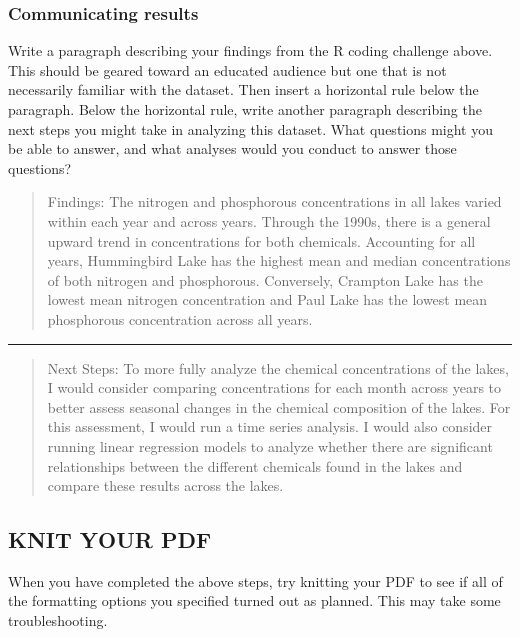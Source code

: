 \documentclass[
]{article}
\begin{document}
\hypertarget{communicating-results}{%
\subsubsection{Communicating results}\label{communicating-results}}

Write a paragraph describing your findings from the R coding challenge
above. This should be geared toward an educated audience but one that is
not necessarily familiar with the dataset. Then insert a horizontal rule
below the paragraph. Below the horizontal rule, write another paragraph
describing the next steps you might take in analyzing this dataset. What
questions might you be able to answer, and what analyses would you
conduct to answer those questions?

\begin{quote}
Findings: The nitrogen and phosphorous concentrations in all lakes
varied within each year and across years. Through the 1990s, there is a
general upward trend in concentrations for both chemicals. Accounting
for all years, Hummingbird Lake has the highest mean and median
concentrations of both nitrogen and phosphorous. Conversely, Crampton
Lake has the lowest mean nitrogen concentration and Paul Lake has the
lowest mean phosphorous concentration across all years.
\end{quote}

\begin{center}\rule{0.5\linewidth}{0.5pt}\end{center}

\begin{quote}
Next Steps: To more fully analyze the chemical concentrations of the
lakes, I would consider comparing concentrations for each month across
years to better assess seasonal changes in the chemical composition of
the lakes. For this assessment, I would run a time series analysis. I
would also consider running linear regression models to analyze whether
there are significant relationships between the different chemicals
found in the lakes and compare these results across the lakes.
\end{quote}

\hypertarget{knit-your-pdf}{%
\subsection{KNIT YOUR PDF}\label{knit-your-pdf}}

When you have completed the above steps, try knitting your PDF to see if
all of the formatting options you specified turned out as planned. This
may take some troubleshooting.
\end{document}
